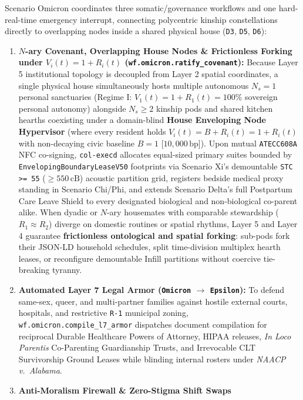 Scenario Omicron coordinates three somatic/governance workflows and one hard-real-time
emergency interrupt, connecting polycentric kinship constellations directly to overlapping
nodes inside a shared physical house (\texttt{D3}, \texttt{D5}, \texttt{D6}):
\begin{enumerate}
    \item \textbf{$N$-ary Covenant, Overlapping House Nodes \& Frictionless Forking under $V_i(t) = 1 + R_i(t)$ (\texttt{wf.omicron.ratify\_covenant}):}
    Because Layer 5 institutional topology is decoupled from Layer 2 spatial coordinates, a
    single physical house simultaneously hosts multiple autonomous $N_s = 1$ personal
    sanctuaries (Regime I: $V_1(t) = 1 + R_1(t) = 100\%$ sovereign personal autonomy) alongside
    $N_s \ge 2$ kinship pods and shared kitchen hearths coexisting under a domain-blind
    \textbf{House Enveloping Node Hypervisor} (where every resident holds $V_i(t) = B + R_i(t) = 1 + R_i(t)$
    with non-decaying civic baseline $B = 1$ [$10{,}000\,\mathrm{bp}$]). Upon mutual
    \texttt{ATECC608A} NFC co-signing, \texttt{col-execd} allocates equal-sized primary suites
    bounded by \texttt{EnvelopingBoundaryLeaseV50} footprints via Scenario Xi's demountable
    \texttt{STC >= 55} ($\ge 550\,\mathrm{cB}$) acoustic partition grid, registers bedside
    medical proxy standing in Scenario Chi/Phi, and extends Scenario Delta's full Postpartum
    Care Leave Shield to every designated biological and non-biological co-parent alike. When
    dyadic or $N$-ary housemates with comparable stewardship ($R_1 \approx R_2$) diverge on
    domestic routines or spatial rhythms, Layer 5 and Layer 4 guarantee \textbf{frictionless
    ontological and spatial forking}: sub-pods fork their JSON-LD household schedules, split
    time-division multiplex hearth leases, or reconfigure demountable Infill partitions without
    coercive tie-breaking tyranny.
    \item \textbf{Automated Layer 7 Legal Armor (\texttt{Omicron} $\to$ \texttt{Epsilon}):}
    To defend same-sex, queer, and multi-partner families against hostile external courts,
    hospitals, and restrictive \texttt{R-1} municipal zoning, \texttt{wf.omicron.compile\_l7\_armor}
    dispatches document compilation for reciprocal Durable Healthcare Powers of Attorney,
    HIPAA releases, \textit{In Loco Parentis} Co-Parenting Guardianship Trusts, and Irrevocable
    CLT Survivorship Ground Leases while blinding internal rosters under \textit{NAACP v.\ Alabama}.
    \item \textbf{Anti-Moralism Firewall \& Zero-Stigma Shift Swaps
}
\end{enumerate}
